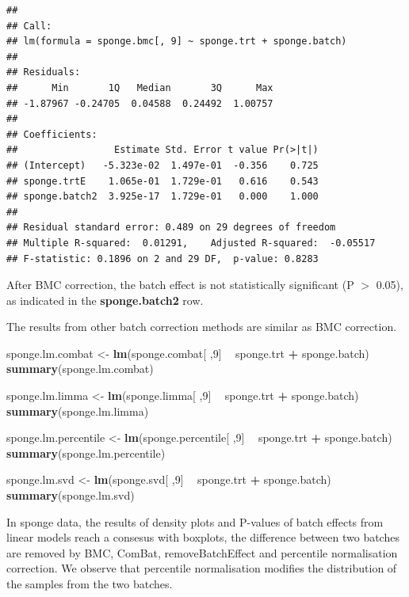 \documentclass[]{book}
\newenvironment{Shaded}{\begin{snugshade}}{\end{snugshade}}
\newcommand{\KeywordTok}[1]{\textcolor[rgb]{0.13,0.29,0.53}{\textbf{#1}}}
\newcommand{\DecValTok}[1]{\textcolor[rgb]{0.00,0.00,0.81}{#1}}
\newcommand{\StringTok}[1]{\textcolor[rgb]{0.31,0.60,0.02}{#1}}
\newcommand{\OperatorTok}[1]{\textcolor[rgb]{0.81,0.36,0.00}{\textbf{#1}}}
\newcommand{\NormalTok}[1]{#1}
\begin{document}
\begin{verbatim}
## 
## Call:
## lm(formula = sponge.bmc[, 9] ~ sponge.trt + sponge.batch)
## 
## Residuals:
##      Min       1Q   Median       3Q      Max 
## -1.87967 -0.24705  0.04588  0.24492  1.00757 
## 
## Coefficients:
##                 Estimate Std. Error t value Pr(>|t|)
## (Intercept)   -5.323e-02  1.497e-01  -0.356    0.725
## sponge.trtE    1.065e-01  1.729e-01   0.616    0.543
## sponge.batch2  3.925e-17  1.729e-01   0.000    1.000
## 
## Residual standard error: 0.489 on 29 degrees of freedom
## Multiple R-squared:  0.01291,    Adjusted R-squared:  -0.05517 
## F-statistic: 0.1896 on 2 and 29 DF,  p-value: 0.8283
\end{verbatim}

After BMC correction, the batch effect is not statistically significant
(P \(>\) 0.05), as indicated in the \textbf{sponge.batch2} row.

The results from other batch correction methods are similar as BMC
correction.

\begin{Shaded}
\begin{Highlighting}[]
\NormalTok{sponge.lm.combat <-}\StringTok{ }\KeywordTok{lm}\NormalTok{(sponge.combat[ ,}\DecValTok{9}\NormalTok{] }\OperatorTok{~}\StringTok{ }\NormalTok{sponge.trt }\OperatorTok{+}\StringTok{ }\NormalTok{sponge.batch)}
\KeywordTok{summary}\NormalTok{(sponge.lm.combat)}

\NormalTok{sponge.lm.limma <-}\StringTok{ }\KeywordTok{lm}\NormalTok{(sponge.limma[ ,}\DecValTok{9}\NormalTok{] }\OperatorTok{~}\StringTok{ }\NormalTok{sponge.trt }\OperatorTok{+}\StringTok{ }\NormalTok{sponge.batch)}
\KeywordTok{summary}\NormalTok{(sponge.lm.limma)}

\NormalTok{sponge.lm.percentile <-}\StringTok{ }\KeywordTok{lm}\NormalTok{(sponge.percentile[ ,}\DecValTok{9}\NormalTok{] }\OperatorTok{~}\StringTok{ }\NormalTok{sponge.trt }\OperatorTok{+}\StringTok{ }\NormalTok{sponge.batch)}
\KeywordTok{summary}\NormalTok{(sponge.lm.percentile)}

\NormalTok{sponge.lm.svd <-}\StringTok{ }\KeywordTok{lm}\NormalTok{(sponge.svd[ ,}\DecValTok{9}\NormalTok{] }\OperatorTok{~}\StringTok{ }\NormalTok{sponge.trt }\OperatorTok{+}\StringTok{ }\NormalTok{sponge.batch)}
\KeywordTok{summary}\NormalTok{(sponge.lm.svd)}
\end{Highlighting}
\end{Shaded}

In sponge data, the results of density plots and P-values of batch
effects from linear models reach a consesus with boxplots, the
difference between two batches are removed by BMC, ComBat,
removeBatchEffect and percentile normalisation correction. We observe
that percentile normalisation modifies the distribution of the samples
from the two batches.
\end{document}
